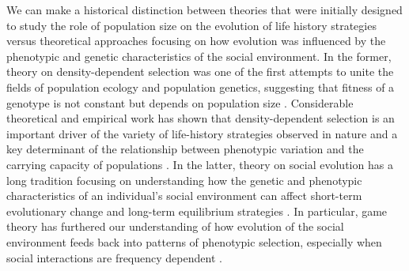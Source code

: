 \documentclass{article}
\begin{document}
We can make a historical distinction between theories that were initially designed to study the role of population size on the evolution of life history strategies versus theoretical approaches focusing on how evolution was influenced by the phenotypic and genetic characteristics of the social environment. In the former, theory on density-dependent selection was one of the first attempts to unite the fields of population ecology and population genetics, suggesting that fitness of a genotype is not constant but depends on population size \citep{MacArthur1962, Anderson1971, Charlesworth1971}. Considerable theoretical and empirical work has shown that density-dependent selection is an important driver of the variety of life-history strategies observed in nature and a key determinant of the relationship between phenotypic variation and the carrying capacity of populations \citep{macarthur1967theory,  Boyce1984, Mueller1991, Charlesworth1994,Travis2013, Joshi2001, Engen2013, Wright2018, Engen2020}. In the latter, theory on social evolution has a long tradition focusing on understanding how the genetic and phenotypic characteristics of an individual's social environment can affect short-term evolutionary change \citep{Hamilton1964a, frank1998foundations, Wolf1999SocialSelection, Queller1985a, Queller2017} and long-term equilibrium strategies \citep{MaynardSmith1982, McGill2007}. In particular, game theory has furthered our understanding of how evolution of the social environment feeds back into patterns of phenotypic selection, especially when social interactions are frequency dependent \citep{West-Eberhard1979, QUELLER1984, Araya-Ajoy2020}. 
\end{document}
